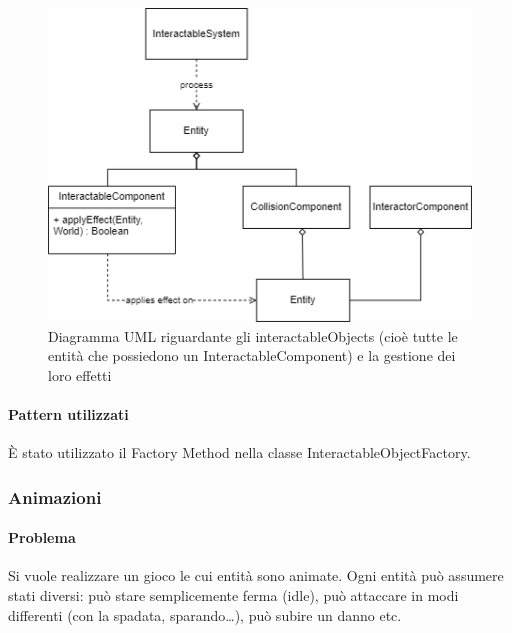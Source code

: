\documentclass[a4paper,12pt]{report}
\begin{document}
	\begin{figure}[h]
		\centering
		\includegraphics[width=\textwidth]{uml/uml_interactableSystem.png}
		\caption{Diagramma UML riguardante gli interactableObjects (cioè tutte le entità che possiedono un InteractableComponent) e la gestione dei loro effetti}
	\end{figure}
	
\paragraph*{Pattern utilizzati}
	È stato utilizzato il Factory Method nella classe InteractableObjectFactory.

\subsubsection{Animazioni}
\paragraph*{Problema}
	Si vuole realizzare un gioco le cui entità sono animate. Ogni entità può assumere stati diversi: può stare semplicemente ferma (idle), può attaccare in modi differenti (con la spadata, sparando…), può subire un danno etc.
\end{document}
